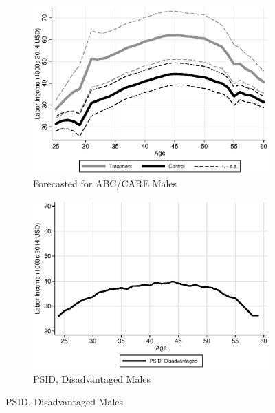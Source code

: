 



\begin{figure}
\centering
\caption{Labor Income Profiles}\label{fig:control-sub}
\begin{subfigure}[h]{0.4\textwidth}
		\centering
		\caption{Forecasted for ABC/CARE Males} \label{fig:abcare1}
		\includegraphics[width=\textwidth]{output/labor_25-60_male.eps}
\end{subfigure}%
\begin{subfigure}[h]{0.4\textwidth}
	\centering
	\caption{PSID, Disadvantaged Males} \label{fig:psid1}
		\includegraphics[width=\textwidth]{output/psid_incomeprofiles_s1.eps}
\end{subfigure}


\end{figure}
